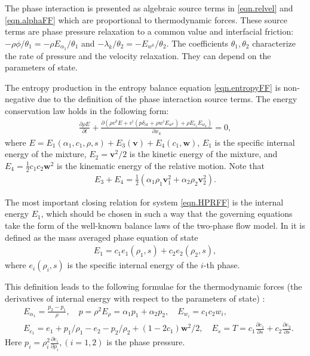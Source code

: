 \documentclass[3p,times,table]{article}
\newcommand{\vv}{{\bm{v}}}
\newcommand{\ww}{{\bm{w}}}
\begin{document}
The phase interaction is presented as algebraic source terms in 
\eqref{eqn.relvel} and \eqref{eqn.alphaFF} which are proportional to 
thermodynamic forces. These source terms are phase pressure relaxation to a 
common value and interfacial friction: $-\rho{\phi}/{\theta_1} = 
-\rho{E_{\alpha_1}}/{\theta_1}$ and $-{\lambda_{k} }/{\theta_2} = 
-{E_{w^k}}/{\theta_2}$. The coefficients $\theta_1,\theta_2$ characterize the rate 
of pressure and the velocity relaxation. They can depend on the parameters of state.

The entropy production in the entropy balance equation \eqref{eqn.entropyFF} is 
non-negative due to the definition of the phase interaction source terms.
The energy conservation law holds in the following form:
\begin{align} \label{eqn.energyFF}
\displaystyle\frac{\partial \rho E}{\partial t}+
\frac{\partial \left(\rho  v^k E +v^i(p \delta_{ik}+\rho w^i E_{w^k}) +\rho E_{c_1}E_{w_k} \right)}{\partial x_k}=0,
\end{align}
where $E=E_1(\alpha_1, c_1, \rho, s)+E_3(\vv)+E_4(c_1,\ww)$, $E_1$ is the 
specific internal energy of the mixture, $E_2=\vv^2/2$ is the kinetic energy of 
the mixture, and $E_4=\frac{1}{2}c_1c_2\ww^2$ is the kinematic energy of the
relative motion.
Note that 
\begin{align}
E_3+E_4=\frac{1}{2}(\alpha_1\rho_1 \vv_1^2+\alpha_2\rho_2 \vv_2^2). 
\end{align}

The most important closing relation for system \eqref{eqn.HPRFF}
is the internal energy  $E_1$, which should be chosen in such a way that the 
governing equations  take the form of the well-known balance laws of the two-phase  
flow model. In \cite{RomDrikToro2010,Romenski2016} it is defined as the mass 
averaged phase equation of state
\begin{align}
E_1=c_1e_1(\rho_1,s)+c_2e_2(\rho_2,s),
\end{align} 
where $e_i(\rho_i,s)$ is the specific internal energy of the $ i $-th phase.

This definition leads to the following formulae for the thermodynamic forces (the derivatives of internal energy with respect to the parameters of state) \cite{RomDrikToro2010,Romenski2016}:
\begin{eqnarray} \label{Thermod.forces}
& E_{\alpha_1}=\frac{p_2-p_1}{\rho}, \quad p=\rho^2E_\rho={\alpha_1p_1+\alpha_2p_2}, \quad E_{w_i}=c_1c_2 w_i, \\
& E_{c_1}=e_1+p_1/\rho_1-e_2-p_2/\rho_2+(1-2c_1)\ww^2/2, \quad 
E_s=T=c_1\frac{\partial e_1}{\partial s}+c_2\frac{\partial e_2}{\partial s}. 
\nonumber
\end{eqnarray}  
Here $p_i=\rho_i^2\frac{\partial e_i}{\partial \rho_i}, (i=1,2)$ is the phase 
pressure.
\end{document}
